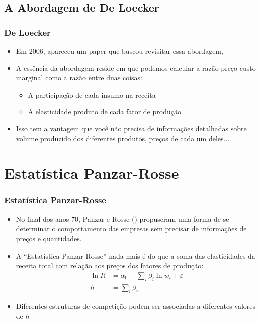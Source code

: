 \documentclass{beamer}
\begin{document}
\subsection{A Abordagem de De Loecker}
\begin{frame}[fragile]\frametitle{De Loecker}
    \begin{itemize}
        \item Em 2006, apareceu um paper que buscou revisitar essa abordagem, \citet{Loecker2009a}
        \item A essência da abordagem reside em que podemos calcular a razão preço-custo marginal como a razão entre duas coisas:
        \begin{itemize}
            \item A participação de cada insumo na receita
            \item A elasticidade produto de cada fator de produção
        \end{itemize}
        \item Isso tem a vantagem que você não precisa de informações detalhadas sobre volume produzido dos diferentes produtos, preços de cada um deles...
    \end{itemize}


\end{frame}

\section{Estatística Panzar-Rosse}
\begin{frame}[fragile]\frametitle{Estatística Panzar-Rosse}
\begin{itemize}
	\item No final dos anos 70, Panzar e Rosse (\citet{Panzar1987}) propuseram uma forma de se determinar o comportamento das empresas sem precisar de informações de preços e quantidades. 
	\item A ``Estatística Panzar-Rosse'' nada mais é do que a soma das elasticidades da receita total com relação aos preços dos fatores de produção:
	\begin{align*}
	\ln{R}&=\alpha_{0}+\sum_{i} \beta_{i}\ln{w_{i}}+\varepsilon\\
	h&=\sum_{i} \beta_{i}
	\end{align*}
	\item Diferentes estruturas de competição podem ser associadas a diferentes valores de $h$
\end{itemize}
    


\end{frame}
\end{document}

